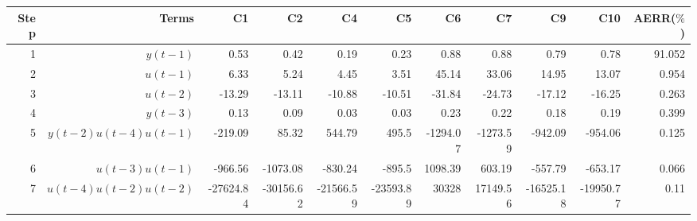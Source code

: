 \begin{tabular}{rrrrrrrrrrr}
Step & Terms & C1 & C2 & C4 & C5 & C6 & C7 & C9 & C10 & AERR($\%$) \\ 
\hline 
1 & $y(t-1)$ & 0.53 & 0.42 & 0.19 & 0.23 & 0.88 & 0.88 & 0.79 & 0.78 & 91.052 \\ 
2 & $u(t-1)$ & 6.33 & 5.24 & 4.45 & 3.51 & 45.14 & 33.06 & 14.95 & 13.07 & 0.954 \\ 
3 & $u(t-2)$ & -13.29 & -13.11 & -10.88 & -10.51 & -31.84 & -24.73 & -17.12 & -16.25 & 0.263 \\ 
4 & $y(t-3)$ & 0.13 & 0.09 & 0.03 & 0.03 & 0.23 & 0.22 & 0.18 & 0.19 & 0.399 \\ 
5 & $y(t-2)u(t-4)u(t-1)$ & -219.09 & 85.32 & 544.79 & 495.5 & -1294.07 & -1273.59 & -942.09 & -954.06 & 0.125 \\ 
6 & $u(t-3)u(t-1)$ & -966.56 & -1073.08 & -830.24 & -895.5 & 1098.39 & 603.19 & -557.79 & -653.17 & 0.066 \\ 
7 & $u(t-4)u(t-2)u(t-2)$ & -27624.84 & -30156.62 & -21566.59 & -23593.89 & 30328 & 17149.56 & -16525.18 & -19950.77 & 0.11 \\ 
\hline 
\end{tabular}